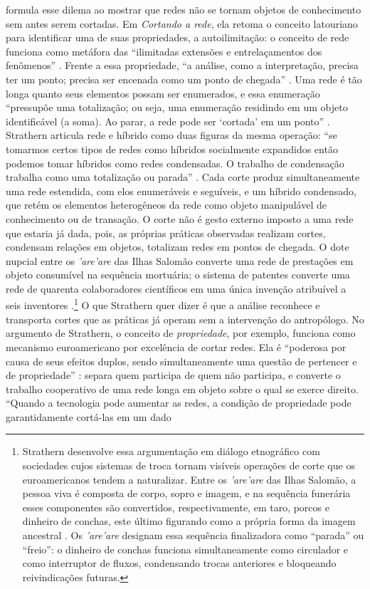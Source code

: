 \textcite{strathern2011cortando} formula esse dilema ao mostrar que redes não se tornam objetos de conhecimento sem antes serem cortadas. Em \textit{Cortando a rede}, ela retoma o conceito latouriano para identificar uma de suas propriedades, a autoilimitação: o conceito de rede funciona como metáfora das ``ilimitadas extensões e entrelaçamentos dos fenômenos'' \parencite[p.~7]{strathern2011cortando}. Frente a essa propriedade, ``a análise, como a interpretação, precisa ter um ponto; precisa ser encenada como um ponto de chegada'' \parencite[p.~7]{strathern2011cortando}. Uma rede é tão longa quanto seus elementos possam ser enumerados, e essa enumeração ``pressupõe uma totalização; ou seja, uma enumeração residindo em um objeto identificável (a soma). Ao parar, a rede pode ser `cortada' em um ponto'' \parencite[p.~7]{strathern2011cortando}. Strathern articula rede e híbrido como duas figuras da mesma operação: ``se tomarmos certos tipos de redes como híbridos socialmente expandidos então podemos tomar híbridos como redes condensadas. O trabalho de condensação trabalha como uma totalização ou parada'' \parencite[pp.~7--8]{strathern2011cortando}. Cada corte produz simultaneamente uma rede estendida, com elos enumeráveis e seguíveis, e um híbrido condensado, que retém os elementos heterogêneos da rede como objeto manipulável de conhecimento ou de transação. O corte não é gesto externo imposto a uma rede que estaria já dada, pois, as próprias práticas observadas realizam cortes, condensam relações em objetos, totalizam redes em pontos de chegada. O dote nupcial entre os \textit{'are'are} das Ilhas Salomão converte uma rede de prestações em objeto consumível na sequência mortuária; o sistema de patentes converte uma rede de quarenta colaboradores científicos em uma única invenção atribuível a seis inventores \parencite[pp.~8--9]{strathern2011cortando}.\footnote{Strathern desenvolve essa argumentação em diálogo etnográfico com sociedades cujos sistemas de troca tornam visíveis operações de corte que os euroamericanos tendem a naturalizar. Entre os \textit{'are'are} das Ilhas Salomão, a pessoa viva é composta de corpo, sopro e imagem, e na sequência funerária esses componentes são convertidos, respectivamente, em taro, porcos e dinheiro de conchas, este último figurando como a própria forma da imagem ancestral \parencite[pp.~10--12]{strathern2011cortando}. Os \textit{'are'are} designam essa sequência finalizadora como ``parada'' ou ``freio'': o dinheiro de conchas funciona simultaneamente como circulador e como interruptor de fluxos, condensando trocas anteriores e bloqueando reivindicações futuras.} O que Strathern quer dizer é que a análise reconhece e transporta cortes que as práticas já operam sem a intervenção do antropólogo. No argumento de Strathern, o conceito de \textit{propriedade}, por exemplo, funciona como mecanismo euroamericano por excelência de cortar redes. Ela é ``poderosa por causa de seus efeitos duplos, sendo simultaneamente uma questão de pertencer e de propriedade'' \parencite[p.~16]{strathern2011cortando}: separa quem participa de quem não participa, e converte o trabalho cooperativo de uma rede longa em objeto sobre o qual se exerce direito. ``Quando a tecnologia pode aumentar as redes, a condição de propriedade pode garantidamente cortá-las em um dado 